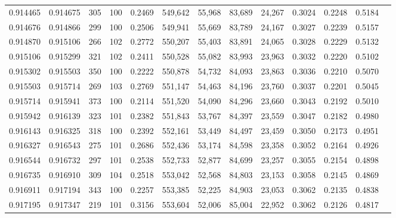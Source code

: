 \begin{tabular}{rrrrrrrrrrrrr}
0.914465 & 0.914675 &   305 & 100 &                                     0.2469 & 549,642 &  55,968 &  83,689 &  24,267 & 0.3024 & 0.2248 & 0.5184 \\
0.914676 & 0.914866 &   299 & 100 &                                     0.2506 & 549,941 &  55,669 &  83,789 &  24,167 & 0.3027 & 0.2239 & 0.5157 \\
0.914870 & 0.915106 &   266 & 102 &                                     0.2772 & 550,207 &  55,403 &  83,891 &  24,065 & 0.3028 & 0.2229 & 0.5132 \\
0.915106 & 0.915299 &   321 & 102 &                                     0.2411 & 550,528 &  55,082 &  83,993 &  23,963 & 0.3032 & 0.2220 & 0.5102 \\
0.915302 & 0.915503 &   350 & 100 &                                     0.2222 & 550,878 &  54,732 &  84,093 &  23,863 & 0.3036 & 0.2210 & 0.5070 \\
0.915503 & 0.915714 &   269 & 103 &                                     0.2769 & 551,147 &  54,463 &  84,196 &  23,760 & 0.3037 & 0.2201 & 0.5045 \\
0.915714 & 0.915941 &   373 & 100 &                                     0.2114 & 551,520 &  54,090 &  84,296 &  23,660 & 0.3043 & 0.2192 & 0.5010 \\
0.915942 & 0.916139 &   323 & 101 &                                     0.2382 & 551,843 &  53,767 &  84,397 &  23,559 & 0.3047 & 0.2182 & 0.4980 \\
0.916143 & 0.916325 &   318 & 100 &                                     0.2392 & 552,161 &  53,449 &  84,497 &  23,459 & 0.3050 & 0.2173 & 0.4951 \\
0.916327 & 0.916543 &   275 & 101 &                                     0.2686 & 552,436 &  53,174 &  84,598 &  23,358 & 0.3052 & 0.2164 & 0.4926 \\
0.916544 & 0.916732 &   297 & 101 &                                     0.2538 & 552,733 &  52,877 &  84,699 &  23,257 & 0.3055 & 0.2154 & 0.4898 \\
0.916735 & 0.916910 &   309 & 104 &                                     0.2518 & 553,042 &  52,568 &  84,803 &  23,153 & 0.3058 & 0.2145 & 0.4869 \\
0.916911 & 0.917194 &   343 & 100 &                                     0.2257 & 553,385 &  52,225 &  84,903 &  23,053 & 0.3062 & 0.2135 & 0.4838 \\
0.917195 & 0.917347 &   219 & 101 &                                     0.3156 & 553,604 &  52,006 &  85,004 &  22,952 & 0.3062 & 0.2126 & 0.4817 \\

\end{tabular}
